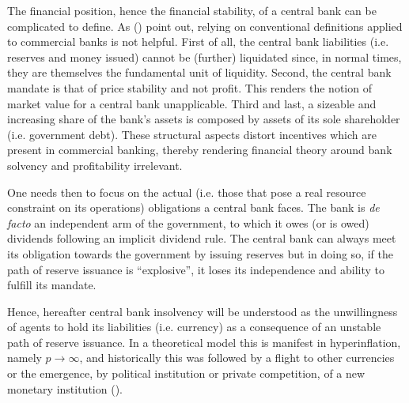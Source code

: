 \documentclass[american]{scrartcl}
\newcommand{\citein}[1]{\citeauthor{#1} (\citeyear{#1})}
\begin{document}
The financial position, hence the financial stability, of a central bank can be complicated to define. As \citein{Hall2015} point out, relying on conventional definitions applied to commercial banks is not helpful. First of all, the central bank liabilities (i.e. reserves and money issued) cannot be (further) liquidated since, in normal times, they are themselves the fundamental unit of liquidity. Second, the central bank mandate is that of price stability and not profit. This renders the notion of market value for a central bank unapplicable. Third and last, a sizeable and increasing share of the bank's assets is composed by assets of its sole shareholder (i.e. government debt). These structural aspects distort incentives which are present in commercial banking, thereby rendering financial theory around bank solvency and profitability irrelevant.

One needs then to focus on the actual (i.e. those that pose a real resource constraint on its operations) obligations a central bank faces. The bank is \textit{de facto} an independent arm of the government, to which it owes (or is owed) dividends following an implicit dividend rule. The central bank can always meet its obligation towards the government by issuing reserves but in doing so, if the path of reserve issuance is ``explosive'', it loses its independence and ability to fulfill its mandate. %

Hence, hereafter central bank insolvency will be understood as the unwillingness of agents to hold its liabilities (i.e. currency) as a consequence of an unstable path of reserve issuance. In a theoretical model this is manifest in hyperinflation, namely $p \xrightarrow{} \infty$, and historically this was followed by a flight to other currencies or the emergence, by political institution or private competition, of a new monetary institution (\cite{Flandreau2007}).



\newpage
\nocite{*}
\printbibliography
\end{document}
